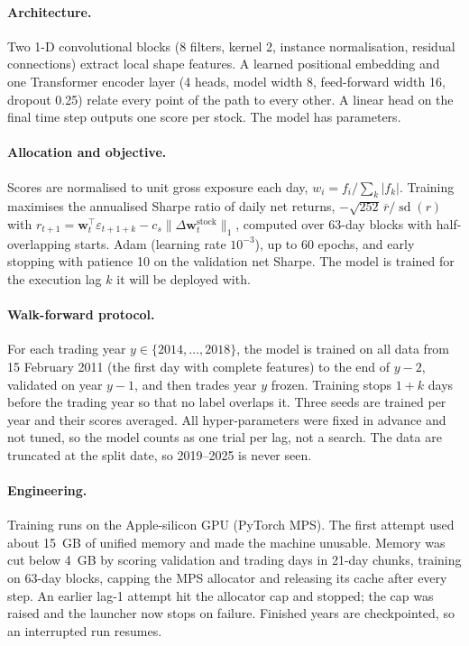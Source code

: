 \documentclass[11pt,a4paper]{article}
\begin{document}
\paragraph{Architecture.} Two 1-D convolutional blocks (8 filters, kernel 2, instance
normalisation, residual connections) extract local shape features. A learned positional
embedding and one Transformer encoder layer (4 heads, model width 8, feed-forward width 16,
dropout 0.25) relate every point of the path to every other. A linear head on the final time
step outputs one score per stock. The model has \MPDeepParams{} parameters.

\paragraph{Allocation and objective.} Scores are normalised to unit gross exposure each day,
$w_i = f_i/\sum_k |f_k|$. Training maximises the annualised Sharpe ratio of daily net returns,
$-\sqrt{252}\,\overline{r}/\operatorname{sd}(r)$ with
$r_{t+1} = \bm w_t^\top \varepsilon_{t+1+k} - c_s\|\Delta\bm w^{\text{stock}}_t\|_1$, computed over
63-day blocks with half-overlapping starts. Adam (learning rate $10^{-3}$), up to 60 epochs, and
early stopping with patience 10 on the validation net Sharpe. The model is trained for the
execution lag $k$ it will be deployed with.

\paragraph{Walk-forward protocol.} For each trading year $y \in \{2014,\dots,2018\}$, the model is
trained on all data from 15 February 2011 (the first day with complete features) to the end of
$y-2$, validated on year $y-1$, and then trades year $y$ frozen. Training stops $1+k$ days before
the trading year so that no label overlaps it. Three seeds are trained per year and their scores
averaged. All hyper-parameters were fixed in advance and not tuned, so the model counts as one
trial per lag, not a search. The data are truncated at the split date, so 2019--2025 is never
seen.

\paragraph{Engineering.} Training runs on the Apple-silicon GPU (PyTorch MPS). The first attempt
used about 15~GB of unified memory and made the machine unusable. Memory was cut below 4~GB by
scoring validation and trading days in 21-day chunks, training on 63-day blocks, capping the
MPS allocator and releasing its cache after every step. An earlier lag-1 attempt hit the
allocator cap and stopped; the cap was raised and the launcher now stops on failure. Finished
years are checkpointed, so an interrupted run resumes.
\end{document}
